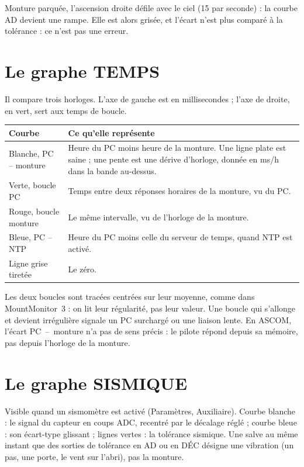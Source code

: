 \begin{tip}
Monture parquée, l'ascension droite défile avec le ciel (15\arcsec{} par
seconde) : la courbe AD devient une rampe. Elle est alors grisée, et l'écart
n'est plus comparé à la tolérance : ce n'est pas une erreur.
\end{tip}

\section{Le graphe TEMPS}
\label{sec:time}

Il compare trois horloges. L'axe de gauche est en millisecondes ; l'axe de
droite, en vert, sert aux temps de boucle.

\begin{center}
\begin{tabularx}{\textwidth}{lX}
\toprule
\textbf{Courbe} & \textbf{Ce qu'elle représente} \\
\midrule
Blanche, PC -- monture & Heure du PC moins heure de la monture. Une ligne
plate est saine ; une pente est une dérive d'horloge, donnée en ms/h dans la
bande au-dessus. \\
Verte, boucle PC & Temps entre deux réponses horaires de la monture, vu du
PC. \\
Rouge, boucle monture & Le même intervalle, vu de l'horloge de la monture. \\
Bleue, PC -- NTP & Heure du PC moins celle du serveur de temps, quand NTP est
activé. \\
Ligne grise tiretée & Le zéro. \\
\bottomrule
\end{tabularx}
\end{center}

Les deux boucles sont tracées centrées sur leur moyenne, comme dans
MountMonitor~3 : on lit leur régularité, pas leur valeur. Une boucle qui
s'allonge et devient irrégulière signale un PC surchargé ou une liaison lente.
En ASCOM, l'écart PC~--~monture n'a pas de sens précis : le pilote répond
depuis sa mémoire, pas depuis l'horloge de la monture.

\section{Le graphe SISMIQUE}
\label{sec:seismic}

Visible quand un sismomètre est activé (Paramètres, Auxiliaire). Courbe
blanche : le signal du capteur en coups ADC, recentré par le décalage réglé ;
courbe bleue : son écart-type glissant ; lignes vertes : la tolérance sismique.
Une salve au même instant que des sorties de tolérance en AD ou en DÉC désigne
une vibration (un pas, une porte, le vent sur l'abri), pas la monture.

